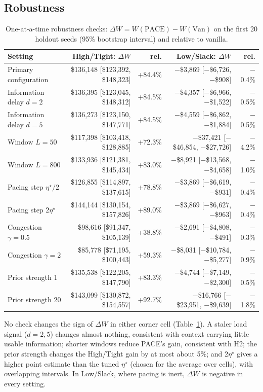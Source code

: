 \documentclass{article}
\begin{document}
\subsection{Robustness}
\begin{table}[h]
\centering\small
\caption{One-at-a-time robustness checks: $\Delta W=W(\mathrm{PACE})-W(\mathrm{Van})$ on the first 20 holdout seeds (95\% bootstrap interval) and relative to vanilla.}
\label{tab:rob}
\begin{tabular}{@{}lrrrr@{}}
\toprule
\textbf{Setting} & High/Tight: $\Delta W$ & rel. & Low/Slack: $\Delta W$ & rel.\\
\midrule
Primary configuration & \$136,148 {\scriptsize[\$123,392, \$148,323]} & +84.4\% & $-$\$3,869 {\scriptsize[$-$\$6,726, $-$\$908]} & $-$0.4\% \\
Information delay $d=2$ & \$136,395 {\scriptsize[\$123,045, \$148,312]} & +84.5\% & $-$\$4,357 {\scriptsize[$-$\$6,966, $-$\$1,522]} & $-$0.5\% \\
Information delay $d=5$ & \$136,273 {\scriptsize[\$123,150, \$147,771]} & +84.5\% & $-$\$4,559 {\scriptsize[$-$\$6,862, $-$\$1,884]} & $-$0.5\% \\
Window $L=50$ & \$117,398 {\scriptsize[\$103,418, \$128,885]} & +72.3\% & $-$\$37,421 {\scriptsize[$-$\$46,854, $-$\$27,726]} & $-$4.2\% \\
Window $L=800$ & \$133,936 {\scriptsize[\$121,381, \$145,434]} & +83.0\% & $-$\$8,921 {\scriptsize[$-$\$13,568, $-$\$4,658]} & $-$1.0\% \\
Pacing step $\eta^\star/2$ & \$126,855 {\scriptsize[\$114,897, \$137,615]} & +78.8\% & $-$\$3,869 {\scriptsize[$-$\$6,619, $-$\$931]} & $-$0.4\% \\
Pacing step $2\eta^\star$ & \$144,144 {\scriptsize[\$130,154, \$157,826]} & +89.0\% & $-$\$3,869 {\scriptsize[$-$\$6,627, $-$\$963]} & $-$0.4\% \\
Congestion $\gamma=0.5$ & \$98,616 {\scriptsize[\$91,347, \$105,139]} & +38.8\% & $-$\$2,691 {\scriptsize[$-$\$4,808, $-$\$491]} & $-$0.3\% \\
Congestion $\gamma=2$ & \$85,778 {\scriptsize[\$71,195, \$100,443]} & +59.3\% & $-$\$8,031 {\scriptsize[$-$\$10,784, $-$\$5,277]} & $-$0.9\% \\
Prior strength 1 & \$135,538 {\scriptsize[\$122,205, \$147,790]} & +83.3\% & $-$\$4,744 {\scriptsize[$-$\$7,149, $-$\$2,300]} & $-$0.5\% \\
Prior strength 20 & \$143,099 {\scriptsize[\$130,872, \$154,557]} & +92.7\% & $-$\$16,766 {\scriptsize[$-$\$23,951, $-$\$9,639]} & $-$1.8\% \\
\bottomrule
\end{tabular}
\end{table}
No check changes the sign of $\Delta W$ in either corner cell (Table~\ref{tab:rob}). A staler load signal ($d=2,5$) changes almost nothing, consistent with context carrying little usable information; shorter windows reduce PACE's gain, consistent with H2; the prior strength changes the High/Tight gain by at most about 5\%; and $2\eta^\star$ gives a higher point estimate than the tuned $\eta^\star$ (chosen for the average over cells), with overlapping intervals. In Low/Slack, where pacing is inert, $\Delta W$ is negative in every setting.
\end{document}
